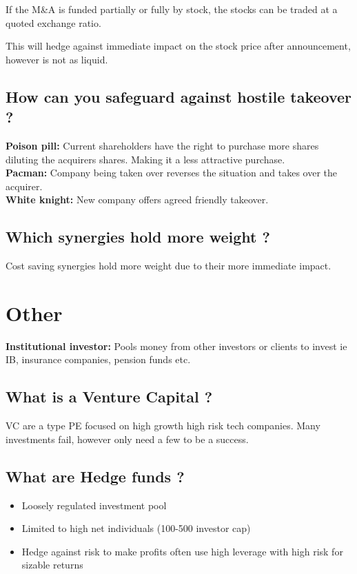 \documentclass[11pt]{scrartcl} %
\begin{document}
If the M\&A is funded partially or fully by stock, the stocks can be traded at a quoted exchange ratio.

This will hedge against immediate impact on the stock price after announcement, however is not as liquid.

\subsection{How can you safeguard against hostile takeover ?}

\textbf{Poison pill:} Current shareholders have the right to purchase more shares diluting the acquirers shares. Making it a less attractive purchase.\\
\textbf{Pacman:} Company being taken over reverses the situation and takes over the acquirer.\\
\textbf{White knight:} New company offers agreed friendly takeover.

\subsection{Which synergies hold more weight ?}

Cost saving synergies hold more weight due to their more immediate impact.

\section{Other}

\textbf{Institutional investor:} Pools money from other investors or clients to invest ie IB, insurance companies, pension funds etc.

\subsection{What is a Venture Capital ?}

VC are a type PE focused on high growth high risk tech companies. Many investments fail, however only need a few to be a success.

\subsection{What are Hedge funds ?}

\begin{itemize}
	\item Loosely regulated investment pool
	\item Limited to high net individuals (100-500 investor cap)
	\item Hedge against risk to make profits often use high leverage with high risk for sizable returns
\end{itemize}
\end{document}
